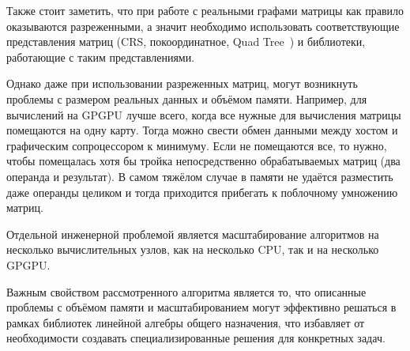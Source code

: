 Также стоит заметить, что при работе с реальными графами матрицы как правило оказываются разреженными, а значит необходимо использовать соответствующие представления матриц (CRS, покоординатное, Quad Tree~\cite{quadtree}) и библиотеки, работающие с таким представлениями.

Однако даже при использовании разреженных матриц, могут возникнуть проблемы с размером реальных данных и объёмом памяти. Например, для вычислений на GPGPU лучше всего, когда все нужные для вычисления матрицы помещаются на одну карту. Тогда можно свести обмен данными между хостом и графическим сопроцессором к минимуму. Если не помещаются все, то нужно, чтобы помещалась хотя бы тройка непосредственно обрабатываемых матриц (два операнда и результат). В самом тяжёлом случае в памяти не удаётся разместить даже операнды целиком и тогда приходится прибегать к поблочному умножению матриц.

Отдельной инженерной проблемой является масштабирование алгоритмов на несколько вычислительных узлов, как на несколько CPU, так и на несколько GPGPU.

Важным свойством рассмотренного алгоритма является то, что описанные проблемы с объёмом памяти и масштабированием могут эффективно решаться в рамках библиотек линейной алгебры общего назначения, что избавляет от необходимости создавать специализированные решения для конкретных задач.


